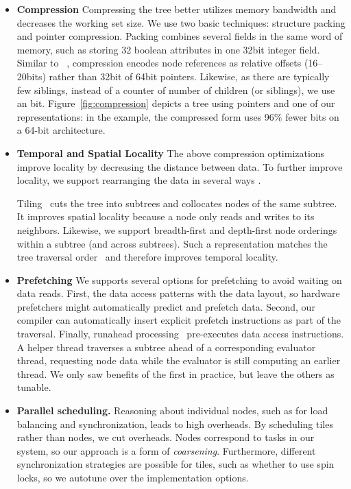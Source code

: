 \begin{itemize}
\item \textbf{Compression} Compressing the tree better utilizes memory bandwidth and decreases the working set size. We use two basic techniques: structure packing and pointer compression. Packing combines several fields in the same word of memory, such as storing 32 boolean attributes in one 32bit integer field. Similar to \citeauthor{compression}~\cite{compression}, compression encodes node references as relative offsets (16--20bits) rather than 32bit of 64bit pointers. Likewise,  as there are typically few siblings, instead of a counter of number of children (or siblings), we use an  bit. Figure~\ref{fig:compression} depicts a tree using pointers and one of our representations: in the example, the compressed form uses 96\% fewer bits on a 64-bit architecture.

\item \textbf{Temporal and Spatial Locality}  The above compression optimizations improve locality by decreasing the distance between data. To further improve locality, we support rearranging the data in several ways .

Tiling~\cite{tiling} cuts the tree into subtrees and collocates nodes of the same subtree. It improves spatial locality because a node only reads and writes to its neighbors. Likewise, we support breadth-first and depth-first node orderings within a subtree (and across subtrees). Such a representation matches the tree traversal order~\cite{Chilimbi:19999} and therefore improves temporal locality. 

\item \textbf{Prefetching} We supports several options for prefetching to avoid waiting on data reads.  First,  the data access patterns with the data layout, so hardware prefetchers might automatically predict and prefetch data. Second, our compiler can automatically insert explicit prefetch instructions as part of the traversal. Finally, runahead processing~\cite{runaheadprocessing} pre-executes data access instructions. A helper thread traverses a subtree ahead of a corresponding evaluator thread, requesting node data while the evaluator is still computing an earlier thread. We only saw benefits of the first in practice, but leave the others as tunable.


\item \textbf{Parallel scheduling.} Reasoning about individual nodes, such as for load balancing and synchronization, leads to high overheads. By scheduling tiles rather than nodes, we cut overheads. Nodes correspond to tasks in our system, so our approach is a form of \emph{coarsening}. Furthermore, different synchronization strategies are possible for tiles, such as whether to use spin locks, so we autotune over the implementation options. 


\end{itemize}
